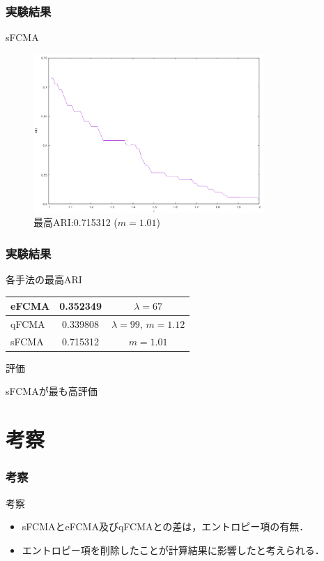\documentclass[13pt,dvipdfmx]{beamer}
\begin{document}
\begin{frame}\frametitle{実験結果}
  \begin{block}{sFCMA}
    \begin{figure}[htbp]
      \begin{center}
        \includegraphics[height=60mm]{sfcma_ARI.png}
      \end{center}
      \captionsetup{labelformat=empty,labelsep=none}
      \caption{最高ARI:0.715312 ($m=1.01$)}
    \end{figure}
  \end{block}
\end{frame}

\begin{frame}\frametitle{実験結果}
  \begin{block}{各手法の最高ARI}
    \vspace{5mm}
    \begin{table}
      \begin{tabular}{ l || c | c }\hline
        eFCMA & 0.352349 & $\lambda = 67$\\ \hline  
        qFCMA & 0.339808 & $\lambda = 99 $\;, \;$m = 1.12$\\  \hline
        sFCMA & 0.715312 & $m = 1.01$\\ \hline
      \end{tabular}
    \end{table}
  \end{block}
  \begin{block}{評価}
    \begin{center}
      sFCMAが最も高評価
    \end{center}
  \end{block}
\end{frame}

\section{考察}
\begin{frame}\frametitle{考察}
  \begin{block}{考察}
    \begin{itemize}
    \item sFCMAとeFCMA及びqFCMAとの差は，エントロピー項の有無．
    \item エントロピー項を削除したことが計算結果に影響したと考えられる．
    \end{itemize}
  \end{block}
\end{frame}
\end{document}
